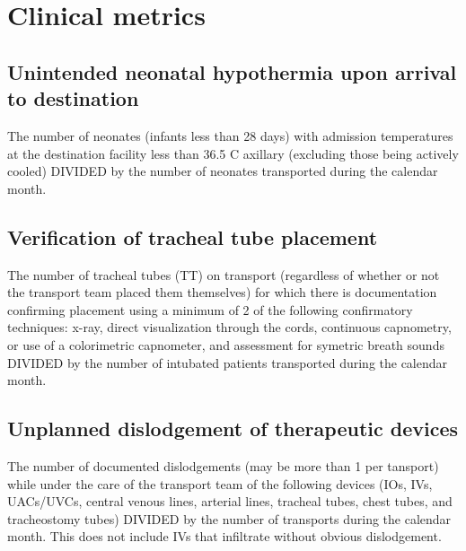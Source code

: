 \documentclass[twoside]{article}\usepackage[]{graphicx}\usepackage[]{color}
\makeatletter
\newenvironment{kframe}{%
 \def\at@end@of@kframe{}%
 \ifinner\ifhmode%
  \def\at@end@of@kframe{\end{minipage}}%
  \begin{minipage}{\columnwidth}%
 \fi\fi%
 \def\FrameCommand##1{\hskip\@totalleftmargin \hskip-\fboxsep
 \colorbox{shadecolor}{##1}\hskip-\fboxsep
     \hskip-\linewidth \hskip-\@totalleftmargin \hskip\columnwidth}%
 \MakeFramed {\advance\hsize-\width
   \@totalleftmargin\z@ \linewidth\hsize
   \@setminipage}}%
 {\par\unskip\endMakeFramed%
 \at@end@of@kframe}
\makeatother
\begin{document}
\newpage
\section{Clinical metrics}
\subsection{Unintended neonatal hypothermia upon arrival to destination}
The number of neonates (infants less than 28 days) with admission temperatures at the destination facility less than 36.5 C axillary (excluding those being actively cooled) DIVIDED by the number of neonates transported during the calendar month.

\begin{center}

\end{center}

\begin{kframe}


{\ttfamily\noindent\bfseries{}}\end{kframe}


\newpage
\subsection{Verification of tracheal tube placement}
The number of tracheal tubes (TT) on transport (regardless of whether or not the transport team placed them themselves) for which there is documentation confirming placement using a minimum of 2 of the following confirmatory techniques: x-ray, direct visualization through the cords, continuous capnometry, or use of a colorimetric capnometer, and assessment for symetric breath sounds DIVIDED by the number of intubated patients transported during the calendar month.

\begin{center}

\end{center}

\begin{kframe}


{\ttfamily\noindent\bfseries{}}\end{kframe}


\newpage
\subsection{Unplanned dislodgement of therapeutic devices}
The number of documented dislodgements (may be more than 1 per tansport) while under the care of the transport team of the following devices (IOs, IVs, UACs/UVCs, central venous lines, arterial lines, tracheal tubes, chest tubes, and tracheostomy tubes) DIVIDED by the number of transports during the calendar month. This does not include IVs that infiltrate without obvious dislodgement.
\end{document}
